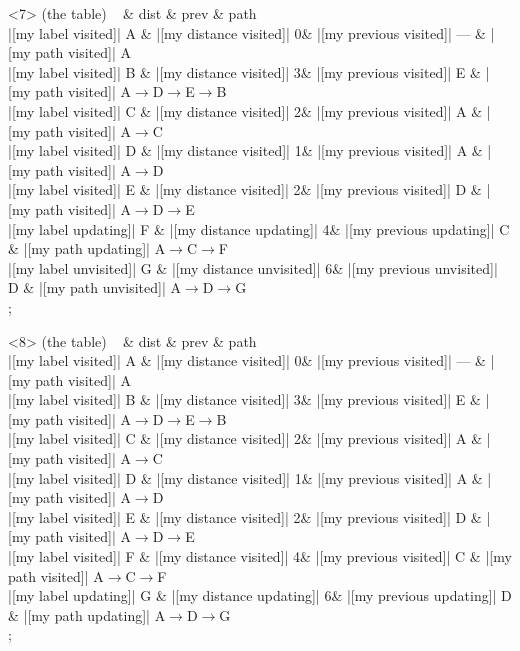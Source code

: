 \begin{onlyenv}<7>
 (the table) {
~ \& dist \& prev \& path \\
|[my label visited]| A \& |[my distance visited]| 0\& |[my previous visited]| --- \& |[my path visited]| A\\
|[my label visited]| B \& |[my distance visited]| 3\& |[my previous visited]| E \& |[my path visited]| A$\rightarrow$D$\rightarrow$E$\rightarrow$B\\
|[my label visited]| C \& |[my distance visited]| 2\& |[my previous visited]| A \& |[my path visited]| A$\rightarrow$C\\
|[my label visited]| D \& |[my distance visited]| 1\& |[my previous visited]| A \& |[my path visited]| A$\rightarrow$D\\
|[my label visited]| E \& |[my distance visited]| 2\& |[my previous visited]| D \& |[my path visited]| A$\rightarrow$D$\rightarrow$E\\
|[my label updating]| F \& |[my distance updating]| 4\& |[my previous updating]| C \& |[my path updating]| A$\rightarrow$C$\rightarrow$F\\
|[my label unvisited]| G \& |[my distance unvisited]| 6\& |[my previous unvisited]| D \& |[my path unvisited]| A$\rightarrow$D$\rightarrow$G\\
};
\end{onlyenv}
            
\begin{onlyenv}<8>
 (the table) {
~ \& dist \& prev \& path \\
|[my label visited]| A \& |[my distance visited]| 0\& |[my previous visited]| --- \& |[my path visited]| A\\
|[my label visited]| B \& |[my distance visited]| 3\& |[my previous visited]| E \& |[my path visited]| A$\rightarrow$D$\rightarrow$E$\rightarrow$B\\
|[my label visited]| C \& |[my distance visited]| 2\& |[my previous visited]| A \& |[my path visited]| A$\rightarrow$C\\
|[my label visited]| D \& |[my distance visited]| 1\& |[my previous visited]| A \& |[my path visited]| A$\rightarrow$D\\
|[my label visited]| E \& |[my distance visited]| 2\& |[my previous visited]| D \& |[my path visited]| A$\rightarrow$D$\rightarrow$E\\
|[my label visited]| F \& |[my distance visited]| 4\& |[my previous visited]| C \& |[my path visited]| A$\rightarrow$C$\rightarrow$F\\
|[my label updating]| G \& |[my distance updating]| 6\& |[my previous updating]| D \& |[my path updating]| A$\rightarrow$D$\rightarrow$G\\
};
\end{onlyenv}
            
